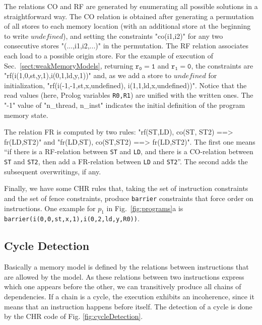 The relations CO and RF are generated by enumerating all possible solutions in a straightforward way.
The CO relation is obtained after generating a permutation of all stores to each memory location
(with an additional store at the beginning to write $undefined$),
and setting the constraints "co(i1,i2)" for any two consecutive stores "(...,i1,i2,...)"
in the permutation. 
The RF relation  associates each load to
a possible origin store. 
For the example of execution of Sec.~\ref{sect:weakMemoryModels},
returning $\mathtt{r_0 = 1}$ and $\mathtt{r_1 = 0}$, the constraints are 
"rf(i(1,0,st,y,1),i(0,1,ld,y,1))" and, as we add a store to $undefined$ for
initialization, "rf(i(-1,-1,st,x,undefined), i(1,1,ld,x,undefined))".
Notice that the read values (here, Prolog variables \texttt{R0,R1}) 
are unified with the written ones. The "-1" value of "n_thread, n_inst"
indicates the initial definition of  the program memory state.

The relation FR is computed by two rules:
"rf(ST,LD), co(ST, ST2) ==> fr(LD,ST2)"
and "fr(LD,ST), co(ST,ST2) ==> fr(LD,ST2)".
The first one means ``if there is a
RF-relation between \texttt{ST} and \texttt{LD}, and there is a
CO-relation between \texttt{ST} and \texttt{ST2}, then add a
FR-relation between \texttt{LD} and \texttt{ST2}''.
The second adds the subsequent overwritings, if any.

Finally, we have some CHR rules that, taking the set of instruction
constraints and the set of fence constraints, produce \texttt{barrier}
constraints that force order on instructions. 
One example for $p_1$ in Fig.~\ref{fig:programs}a is 
\texttt{barrier(i(0,0,st,x,1),i(0,2,ld,y,R0))}.

\subsection{Cycle Detection}\label{subsec:cycleDetect}
Basically a memory model is defined by the relations between
instructions that are allowed by the model. As these relations
between two instructions express which one appears before the other, we
can transitively produce all chains of dependencies. If a chain is a
cycle, the execution exhibits an incoherence, since it means that an
instruction happens before itself.
The detection of a cycle is done by the CHR code of
Fig. \ref{fig:cycleDetection}.

